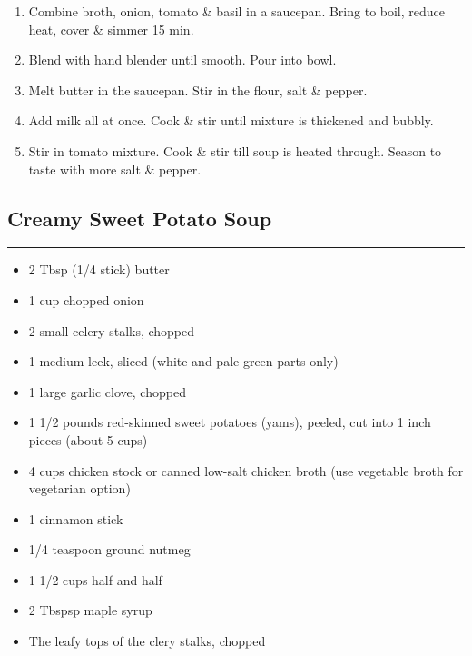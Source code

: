 \documentclass{article}
\begin{document}
\begin{enumerate}
    \item 
        Combine broth, onion, tomato \& basil in a saucepan. Bring to boil, reduce heat, cover \& simmer 15 min.
    \item 
        Blend with hand blender until smooth. Pour into bowl.
    \item
        Melt butter in the saucepan. Stir in the flour, salt \& pepper.
    \item 
        Add milk all at once. Cook \& stir until mixture is thickened and bubbly.
    \item 
        Stir in tomato mixture. Cook \& stir till soup is heated through. Season to taste with more salt \& pepper.
\end{enumerate}
\newpage

\subsection{Creamy Sweet Potato Soup} 
\noindent\rule[0.5ex]{\linewidth}{1pt}

\begin{framed}
\begin{itemize}
    \item 2 Tbsp (1/4 stick) butter
    \item 1 cup chopped onion
    \item 2 small celery stalks, chopped
    \item 1 medium leek, sliced (white and pale green parts only)
    \item 1 large garlic clove, chopped
    \item 1 1/2 pounds red-skinned sweet potatoes (yams), peeled, cut into 1 inch pieces (about 5 cups)
    \item 4 cups chicken stock or canned low-salt chicken broth (use vegetable broth for vegetarian option)
    \item 1 cinnamon stick
    \item 1/4 teaspoon ground nutmeg
    \item 1 1/2 cups half and half
    \item 2 Tbspsp maple syrup
    \item The leafy tops of the clery stalks, chopped
\end{itemize}
\end{framed}
\end{document}
